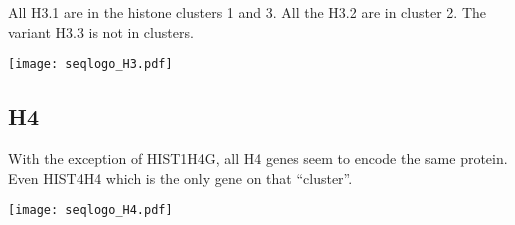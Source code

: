     All H3.1 are in the histone clusters 1 and 3. All the H3.2 are in cluster 2.
    The variant H3.3 is not in clusters.

    \begin{TableAndFigure*}
      \label{tab:H3-consensus}
      

      \texttt{[image: seqlogo\_H3.pdf]}
      \label{fig:H3-weblogo}
    \end{TableAndFigure*}

  \subsection{H4}
    With the exception of HIST1H4G, all H4 genes seem to encode the same protein. Even HIST4H4 which is the
    only gene on that ``cluster''.
    \begin{TableAndFigure*}
      \label{tab:H4-consensus}
      

      \texttt{[image: seqlogo\_H4.pdf]}
      \label{fig:H4-weblogo}
    \end{TableAndFigure*}

